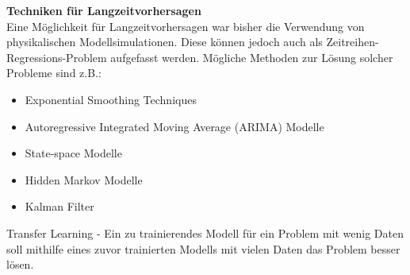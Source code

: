 \documentclass[11pt,ceqn]{book}
\begin{document}
\bigskip
\textbf{Techniken für Langzeitvorhersagen}\\
Eine Möglichkeit für Langzeitvorhersagen war bisher die Verwendung von physikalischen Modellsimulationen. Diese können jedoch auch als Zeitreihen-Regressions-Problem aufgefasst werden. Mögliche Methoden zur Lösung solcher Probleme sind z.B.:
\begin{itemize}
\item Exponential Smoothing Techniques
\item Autoregressive Integrated Moving Average (ARIMA) Modelle
\item State-space Modelle 
\item Hidden Markov Modelle
\item Kalman Filter
\end{itemize}
Transfer Learning - Ein zu trainierendes Modell für ein Problem mit wenig Daten soll mithilfe eines zuvor trainierten Modells mit vielen Daten das Problem besser lösen.\\
\end{document}
